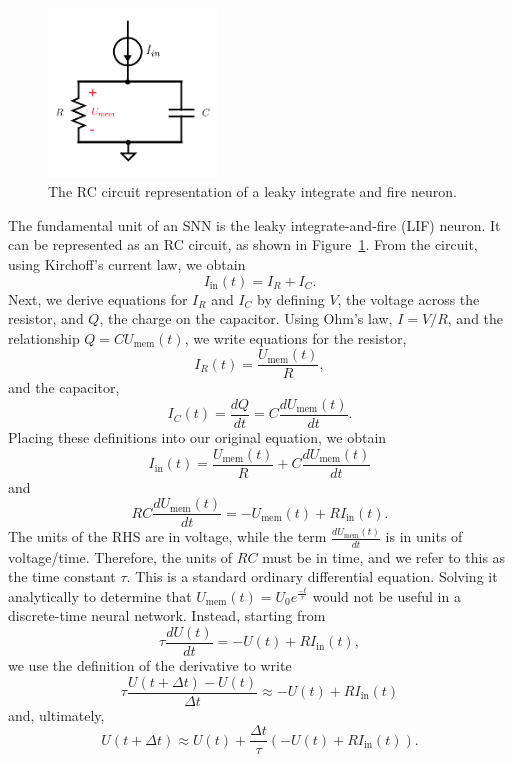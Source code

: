 \documentclass [MS] {UCLAthesis}
\begin{document}
\begin{figure}
    \centering
    \includegraphics[width=0.4\textwidth]{RC_neuron}
    \caption[RC circuit representation of a LIF neuron]{The RC circuit representation of a leaky integrate and fire neuron.}
    \label{fig:rc_circuit}
\end{figure}

The fundamental unit of an SNN is the leaky integrate-and-fire (LIF) neuron. It can be represented as an RC circuit, as shown in Figure~\ref{fig:rc_circuit}. From the circuit, using Kirchoff's current law, we obtain
\begin{equation}
    I_\text{in}(t) = I_R + I_C.
\end{equation}
Next, we derive equations for $ I_R $ and $ I_C $ by defining $V$, the voltage across the resistor, and $Q$, the charge on the capacitor. Using Ohm's law, $ I = V/R $, and the relationship $ Q = CU_\text{mem}(t) $, we write equations for the resistor,
\begin{equation}
    I_R(t) = \frac{U_\text{mem}(t)}{R},
\end{equation}
and the capacitor,
\begin{equation}
    I_C(t) = \frac{dQ}{dt} = C \frac{dU_\text{mem}(t)}{dt}.
\end{equation}
Placing these definitions into our original equation, we obtain
\begin{equation}
    I_\text{in}(t) = \frac{U_\text{mem}(t)}{R} + C \frac{dU_\text{mem}(t)}{dt}
\end{equation}
and
\begin{equation}
   RC \frac{dU_\text{mem}(t)}{dt} = -U_\text{mem}(t) + RI_\text{in}(t).  
\end{equation}
The units of the RHS are in voltage, while the term $\frac{dU_\text{mem}(t)}{dt}$ is in units of voltage/time. Therefore, the units of $RC$ must be in time, and we refer to this as the time constant $\tau$. This is a standard ordinary differential equation. Solving it analytically to determine that $ U_\text{mem}(t) = U_0 e ^{\frac{-t}{\tau}} $ would not be useful in a discrete-time neural network. Instead, starting from 
\begin{equation}
     \tau \frac{dU(t)}{dt} = -U(t) + RI_\text{in}(t),
\end{equation}
we use the definition of the derivative to write
\begin{equation}
    \tau \frac{U(t + \Delta t) - U(t)}{\Delta t}  \approx -U(t) + RI_\text{in}(t)
\end{equation}
and, ultimately, 
\begin{equation}
    U(t + \Delta t) \approx U(t) + \frac{\Delta t}{\tau} (-U(t) + RI_\text{in}(t)).
\end{equation}
\end{document}
